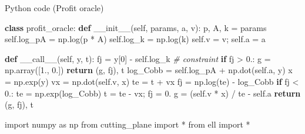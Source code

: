 \documentclass[10pt,ignorenonframetext,serif,onlymath]{beamer}
\newenvironment{Shaded}{}{}
\newcommand{\CommentTok}[1]{\textcolor[rgb]{0.38,0.63,0.69}{\textit{#1}}}
\newcommand{\ControlFlowTok}[1]{\textcolor[rgb]{0.00,0.44,0.13}{\textbf{#1}}}
\newcommand{\DecValTok}[1]{\textcolor[rgb]{0.25,0.63,0.44}{#1}}
\newcommand{\FloatTok}[1]{\textcolor[rgb]{0.25,0.63,0.44}{#1}}
\newcommand{\FunctionTok}[1]{\textcolor[rgb]{0.02,0.16,0.49}{#1}}
\newcommand{\ImportTok}[1]{#1}
\newcommand{\KeywordTok}[1]{\textcolor[rgb]{0.00,0.44,0.13}{\textbf{#1}}}
\newcommand{\NormalTok}[1]{#1}
\newcommand{\OperatorTok}[1]{\textcolor[rgb]{0.40,0.40,0.40}{#1}}
\newcommand{\VariableTok}[1]{\textcolor[rgb]{0.10,0.09,0.49}{#1}}
\begin{document}
\begin{frame}{Python code (Profit oracle)}
\protect\hypertarget{sec:python-code-profit-oracle}{}

\begin{Shaded}
\begin{Highlighting}[]
\KeywordTok{class}\NormalTok{ profit_oracle:}
    \KeywordTok{def} \FunctionTok{__init__}\NormalTok{(}\VariableTok{self}\NormalTok{, params, a, v):}
\NormalTok{        p, A, k }\OperatorTok{=}\NormalTok{ params}
        \VariableTok{self}\NormalTok{.log_pA }\OperatorTok{=}\NormalTok{ np.log(p }\OperatorTok{*}\NormalTok{ A)}
        \VariableTok{self}\NormalTok{.log_k }\OperatorTok{=}\NormalTok{ np.log(k)}
        \VariableTok{self}\NormalTok{.v }\OperatorTok{=}\NormalTok{ v}\OperatorTok{;} \VariableTok{self}\NormalTok{.a }\OperatorTok{=}\NormalTok{ a}

    \KeywordTok{def} \FunctionTok{__call__}\NormalTok{(}\VariableTok{self}\NormalTok{, y, t):}
\NormalTok{        fj }\OperatorTok{=}\NormalTok{ y[}\DecValTok{0}\NormalTok{] }\OperatorTok{-} \VariableTok{self}\NormalTok{.log_k  }\CommentTok{# constraint}
        \ControlFlowTok{if}\NormalTok{ fj }\OperatorTok{>} \FloatTok{0.}\NormalTok{:}
\NormalTok{            g }\OperatorTok{=}\NormalTok{ np.array([}\FloatTok{1.}\NormalTok{, }\FloatTok{0.}\NormalTok{])}
            \ControlFlowTok{return}\NormalTok{ (g, fj), t}
\NormalTok{        log_Cobb }\OperatorTok{=} \VariableTok{self}\NormalTok{.log_pA }\OperatorTok{+}\NormalTok{ np.dot(}\VariableTok{self}\NormalTok{.a, y)}
\NormalTok{        x }\OperatorTok{=}\NormalTok{ np.exp(y)}
\NormalTok{        vx }\OperatorTok{=}\NormalTok{ np.dot(}\VariableTok{self}\NormalTok{.v, x)}
\NormalTok{        te }\OperatorTok{=}\NormalTok{ t }\OperatorTok{+}\NormalTok{ vx}
\NormalTok{        fj }\OperatorTok{=}\NormalTok{ np.log(te) }\OperatorTok{-}\NormalTok{ log_Cobb}
        \ControlFlowTok{if}\NormalTok{ fj }\OperatorTok{<} \FloatTok{0.}\NormalTok{:}
\NormalTok{            te }\OperatorTok{=}\NormalTok{ np.exp(log_Cobb)}
\NormalTok{            t }\OperatorTok{=}\NormalTok{ te }\OperatorTok{-}\NormalTok{ vx}\OperatorTok{;}\NormalTok{ fj }\OperatorTok{=} \FloatTok{0.}
\NormalTok{        g }\OperatorTok{=}\NormalTok{ (}\VariableTok{self}\NormalTok{.v }\OperatorTok{*}\NormalTok{ x) }\OperatorTok{/}\NormalTok{ te }\OperatorTok{-} \VariableTok{self}\NormalTok{.a}
        \ControlFlowTok{return}\NormalTok{ (g, fj), t}

\ImportTok{import}\NormalTok{ numpy }\ImportTok{as}\NormalTok{ np}
\ImportTok{from}\NormalTok{ cutting_plane }\ImportTok{import} \OperatorTok{*}
\ImportTok{from}\NormalTok{ ell }\ImportTok{import} \OperatorTok{*}


\end{Highlighting}
\end{Shaded}
\end{frame}
\end{document}
